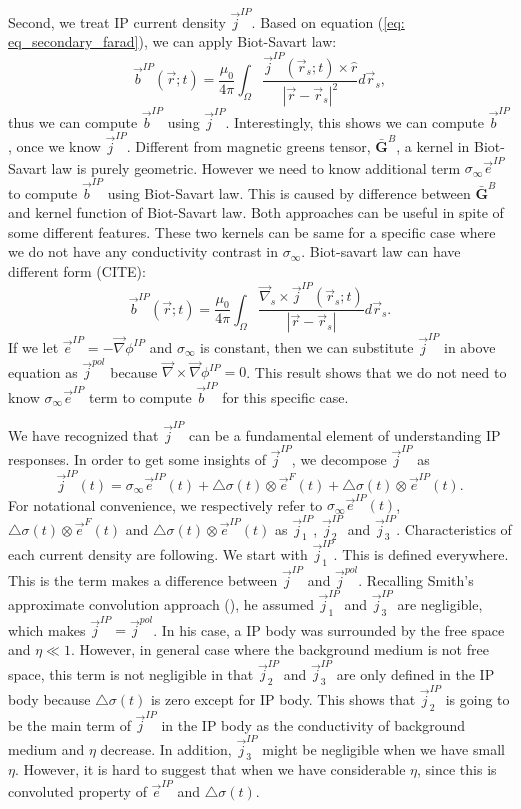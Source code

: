 \documentclass[a4paper, 11pt]{article}
\newcommand{\grad}{\vec \nabla}
\newcommand{\curl}{{\vec \nabla}\times}
\newcommand{\siginf}{\sigma_\infty}
\newcommand{\dsig}{\triangle\sigma}
\renewcommand {\j}  { {\vec j} }
\renewcommand {\b}  { {\vec b} }
\newcommand {\e}  { {\vec e} }
\begin{document}
Second, we treat IP current density $\j^{IP}$. Based on equation (\ref{eq: eq_secondary_farad}), we can apply Biot-Savart law:
\begin{equation}
  \b^{IP}(\vec{r}; t) = \frac{\mu_0}{4\pi}\int_{\Omega}  \frac{\j^{IP}(\vec{r}_s; t)\times\hat{r}}{|\vec{r}-\vec{r}_s|^2}d\vec{r}_s,
\end{equation}
thus we can compute $\b^{IP}$ using $\j^{IP}$. Interestingly, this shows we can compute $\b^{IP}$, once we know $\j^{IP}$. Different from magnetic greens tensor, $\bar{\mathbf{G}}^B$, a kernel in Biot-Savart law is purely geometric. However we need to know additional term $\siginf\e^{IP}$ to compute $\b^{IP}$ using Biot-Savart law. This is caused by difference between $\bar{\mathbf{G}}^B$ and kernel function of Biot-Savart law. Both approaches can be useful in spite of some different features. These two kernels can be same for a specific case where we do not have any conductivity contrast in $\siginf$. Biot-savart law can have different form (CITE):
\begin{equation}
  \b^{IP}(\vec{r}; t) = \frac{\mu_0}{4\pi}\int_{\Omega}  \frac{\vec{\nabla}_s \times \j^{IP}(\vec{r}_s; t)}{|\vec{r}-\vec{r}_s|}d\vec{r}_s.
  \label{eq: Biot}
\end{equation}
If we let $\e^{IP} = -\grad\phi^{IP}$ and $\siginf$ is constant, then we can substitute $\j^{IP}$ in above equation as $\j^{pol}$ because $\curl \grad \phi^{IP} = 0$. This result shows that we do not need to know $\siginf \e^{IP}$ term to compute $\b^{IP}$ for this specific case. 

We have recognized that $\j^{IP}$ can be a fundamental element of understanding IP responses. In order to get some insights of $\j^{IP}$, we decompose $\j^{IP}$ as
\begin{equation}
    \j^{IP}(t) = \siginf\e^{IP}(t) + \dsig(t)\otimes\e^{F}(t)+ \dsig(t)\otimes\e^{IP}(t).
    \label{eq: jip_three}
\end{equation}
For notational convenience, we respectively refer to $\siginf\e^{IP}(t)$, $\dsig(t)\otimes\e^{F}(t)$ and $\dsig(t)\otimes\e^{IP}(t)$ as $\j^{IP}_1$, $\j^{IP}_2$ and $\j^{IP}_3$. Characteristics of each current density are following. We start with $\j^{IP}_1$. This is defined everywhere. This is the term makes a difference between $\j^{IP}$ and $\j^{pol}$. Recalling Smith’s approximate convolution approach (\cite{Smith1988a}), he assumed $\j^{IP}_1$ and $\j^{IP}_3$ are negligible, which makes $\j^{IP} = \j^{pol}$. In his case, a IP body was surrounded by the free space and $\eta \ll 1$.  However, in general case where the background medium is not free space, this term is not negligible in that $\j^{IP}_2$ and $\j^{IP}_3$ are only defined in the IP body because $\dsig(t)$ is zero except for IP body. This shows that $\j^{IP}_2$ is going to be the main term of $\j^{IP}$ in the IP body as the conductivity of background medium and $\eta$ decrease. In addition, $\j^{IP}_3$ might be negligible when we have small $\eta$. However, it is hard to suggest that when we have considerable $\eta$, since this is convoluted property of $\e^{IP}$ and $\dsig(t)$.
\end{document}
